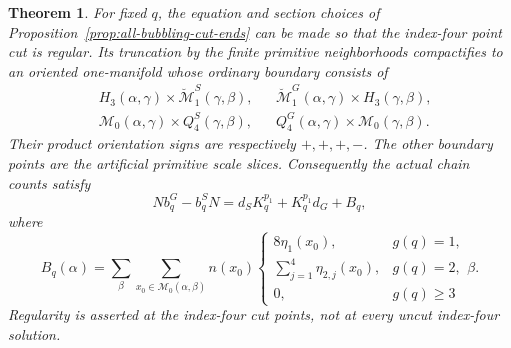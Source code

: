 \documentclass[11pt]{amsart}
\newtheorem{theorem}{Theorem}[section]
\theoremstyle{definition}
\theoremstyle{remark}
\theoremstyle{plain}
\newcommand{\cM}{\mathcal{M}}
\begin{document}
\begin{theorem}\label{thm:fixed-point-global-boundary}
For fixed $q$, the equation and section choices
of Proposition~\ref{prop:all-bubbling-cut-ends}
can be made so that the index-four point cut
is regular. Its truncation by the finite
primitive neighborhoods compactifies to an
oriented one-manifold whose ordinary boundary
consists of
\begin{equation}\label{eq:fixed-point-ordinary-boundary-sets}
 \begin{aligned}
 &H_3(\alpha,\gamma)\times\breve{\cM}^{S}_1(\gamma,\beta),
 &&\breve{\cM}^{G}_1(\alpha,\gamma)\times H_3(\gamma,\beta),\\
 &\cM_0(\alpha,\gamma)\times Q_4^S(\gamma,\beta),
 &&Q_4^G(\alpha,\gamma)\times\cM_0(\gamma,\beta).
 \end{aligned}
\end{equation}
Their product orientation signs are respectively
$+,+,+,-$. The other boundary points are the
artificial primitive scale slices.
Consequently the actual chain counts satisfy
\begin{equation}\label{eq:proved-fixed-point-boundary}
 Nb_q^G-b_q^SN
       =d_SK_q^{p_1}+K_q^{p_1}d_G+B_q,
\end{equation}
where
\begin{equation}\label{eq:proved-fixed-point-B}
 B_q(\alpha)=
 \sum_\beta\sum_{x_0\in\cM_0(\alpha,\beta)}
 n(x_0)
 \begin{cases}
 8\eta_1(x_0),&g(q)=1,\\
 \sum_{j=1}^4\eta_{2,j}(x_0),&g(q)=2,\\
 0,&g(q)\ge3
 \end{cases}\beta.
\end{equation}
Regularity is asserted at the index-four cut
points, not at every uncut index-four solution.
\end{theorem}
\end{document}
